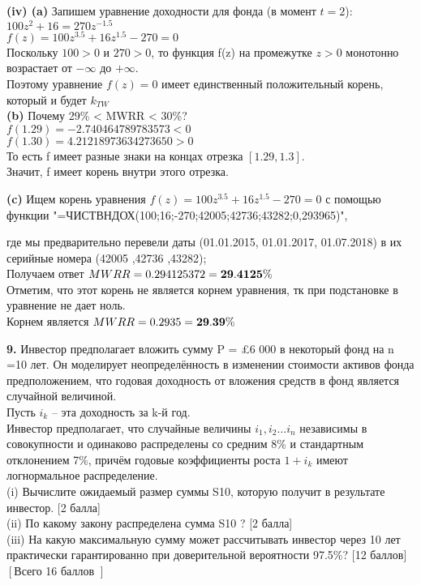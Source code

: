 \documentclass{article}
\begin{document}
{\bf \large  (iv) (a) } Запишем уравнение доходности для фонда (в момент $t=2$):\\

$100z^2 + 16 = 270z^{-1.5}$\\

$f(z)= 100z^{3.5} + 16z^{1.5} - 270 = 0$\\

Поскольку $100>0$ и $270>0$, то функция f(z) на промежутке $z>0$ монотонно возрастает от $-\infty$ до $+\infty$.\\

Поэтому уравнение $f(z)=0$ имеет единственный положительный корень, который и будет $k_{TW}$\\

{\bf (b)} Почему 29\% < MWRR < 30\%?\\

$f(1.29) = -2.740464789783573 < 0$\\
$f(1.30) = 4.21218973634273650 > 0$\\

То есть f имеет разные знаки на концах отрезка $\left[ 1.29, 1.3\right]$. \\
Значит,  f  имеет корень внутри этого отрезка.

{\bf (c)} Ищем корень уравнения  $f(z)= 100z^{3.5} + 16z^{1.5} - 270 = 0$ с помощью функции "=ЧИСТВНДОХ({100;16;-270};{42005;42736;43282};0,293965)",

где мы предварительно перевели даты (01.01.2015, 01.01.2017, 01.07.2018)  в их серийные номера (42005 ,42736 ,43282);\\

Получаем ответ  $MWRR= 0.294125372 =  \bf 29.4125\%$\\

Отметим, что этот корень не является корнем уравнения, тк при подстановке в уравнение не дает ноль.\\

 Корнем является  $MWRR= 0.2935 =  \bf 29.39\%$\



{\bf \large 9.} Инвестор предполагает вложить сумму P = £6 000 в некоторый фонд на n =10 лет. 
Он моделирует неопределённость в изменении стоимости активов фонда предположением, 
что годовая доходность от вложения средств в фонд является случайной величиной. \\
Пусть $i_k$ – эта доходность за k-й год.\\
Инвестор предполагает, что случайные величины $i_1, i_2 \dots i_n $ независимы в совокупности 
и одинаково распределены со средним 8\% и стандартным отклонением 7\%, 
причём годовые коэффициенты роста  $1 +  i_k$ имеют логнормальное распределение.\\
(i) Вычислите ожидаемый размер суммы S10, которую получит в результате инвестор. [2 балла]\\
(ii) По какому закону распределена сумма S10 ? [2 балла]\\
(iii) На какую максимальную сумму может рассчитывать инвестор через 10 лет практически гарантированно при доверительной вероятности 97.5\%? [12 баллов]\\
$\left[\right. $Всего 16 баллов $\left.\right]$\\
\end{document}
